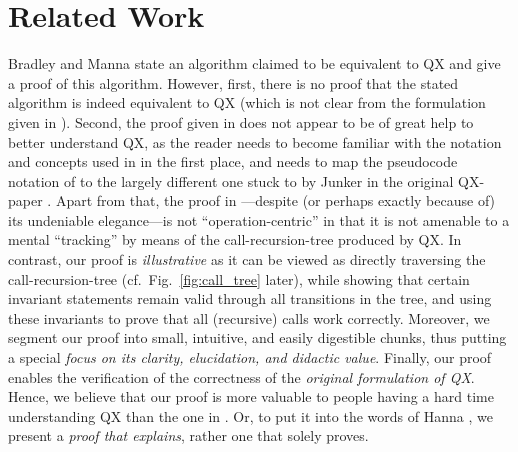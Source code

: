 \documentclass[]{elsarticle}
\begin{document}
	\section{Related Work}
	\label{sec:related}
	Bradley and Manna \cite{bradley2008property} state an algorithm claimed to be equivalent to QX and give a proof of this algorithm. However, first, there is no proof that the stated algorithm is indeed equivalent to QX (which is not clear 
	from the formulation given in \cite{bradley2008property}). Second, the proof given in \cite{bradley2008property} does not appear to be of great help to better understand QX, as the reader needs to become familiar with the notation and concepts used in \cite{bradley2008property} in the first place, and needs to map the pseudocode notation of \cite{bradley2008property} to the largely different one stuck to by Junker in the original QX-paper \cite{junker04}. Apart from that, the proof in \cite{bradley2008property}---despite (or perhaps exactly because of) its undeniable elegance---is not ``operation-centric'' in that it is not amenable to a mental ``tracking'' by means of the call-recursion-tree produced by QX. 
	In contrast, our proof is \emph{illustrative} as it can be viewed as directly traversing the 
	call-recursion-tree (cf.\ Fig.~\ref{fig:call_tree} later), while showing that certain invariant statements remain valid through all transitions in the tree, and using these invariants to prove that all (recursive) calls
	work correctly. Moreover, we segment our proof into small, intuitive, and easily digestible chunks, thus putting a special \emph{focus on its clarity, elucidation, and didactic value}. Finally, our proof enables the verification of the correctness of the \emph{original formulation of QX}.
	Hence, we believe that our proof is more valuable to people 
	having a hard time understanding QX than the one in \cite{bradley2008property}.  
	Or, to put it into the words of Hanna \cite{hanna2000proof,hanna1990some}, we present a \emph{proof that explains}, rather one that solely proves.
\end{document}

